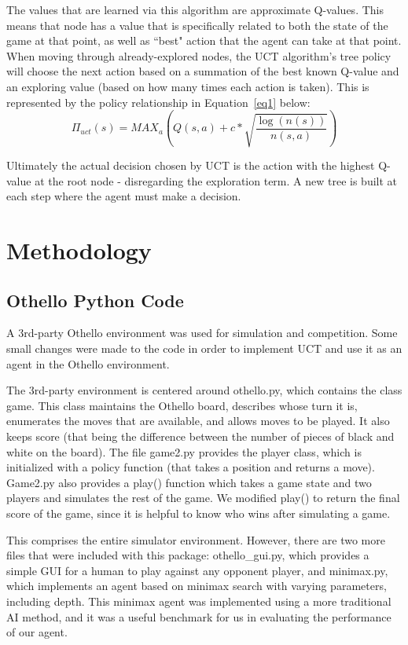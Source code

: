 \documentclass[12pt,letterpaper]{article}
\begin{document}
The values that are learned via this algorithm are approximate Q-values.  This means that node has a value that is specifically related to both the state of the game at that point, as well as ``best" action that the agent can take at that point. When moving through already-explored nodes, the UCT algorithm's tree policy will choose the next action based on a summation of the best known Q-value and an exploring value (based on how many times each action is taken).  This is represented by the policy relationship in Equation~\ref{eq1} below:
\begin{equation}
\label{eq1}
\Pi_{uct}(s) = MAX_a \left( Q(s,a) + c*\sqrt{\frac{\log(n(s))}{n(s,a)}} \right)
\end{equation}

Ultimately the actual decision chosen by UCT is the action with the highest Q-value at the root node - disregarding the exploration term. A new tree is built at each step where the agent must make a decision.

\pagebreak
\section{Methodology}
\label{meth}

\subsection{Othello Python Code}

A 3rd-party Othello environment was used for simulation and competition. Some small changes were made to the code in order to implement UCT and use it as an agent in the Othello environment.

The 3rd-party environment is centered around othello.py, which contains the class game. This class maintains the Othello board, describes whose turn it is, enumerates the moves that are available, and allows moves to be played. It also keeps score (that being the difference between the number of pieces of black and white on the board). The file game2.py provides the player class, which is initialized with a policy function (that takes a position and returns a move). Game2.py also provides a play() function which takes a game state and two players and simulates the rest of the game. We modified play() to return the final score of the game, since it is helpful to know who wins after simulating a game. 

This comprises the entire simulator environment. However, there are two more files that were included with this package: othello\_gui.py, which provides a simple GUI for a human to play against any opponent player, and minimax.py, which implements an agent based on minimax search with varying parameters, including depth. This minimax agent was implemented using a more traditional AI method, and it was a useful benchmark for us in evaluating the performance of our agent.
\end{document}
